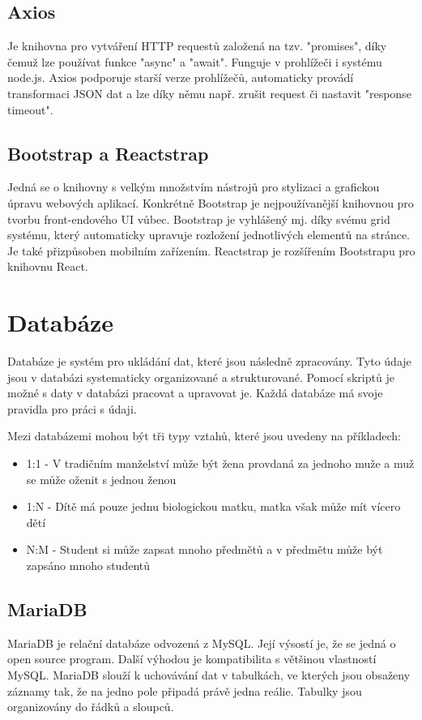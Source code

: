 \subsection{Axios}
Je knihovna pro vytváření HTTP requestů založená na tzv. "promises", díky čemuž lze používat funkce "async" a "await". Funguje v prohlížeči i systému node.js. Axios podporuje starší verze prohlížečů, automaticky provádí transformaci JSON dat a lze díky němu např. zrušit request či nastavit "response timeout". \cite{Axios}

\subsection{Bootstrap a Reactstrap}
Jedná se o knihovny s velkým množstvím nástrojů pro stylizaci a grafickou úpravu webových aplikací. Konkrétně Bootstrap je nejpoužívanější knihovnou pro tvorbu front-endového UI vůbec. Bootstrap je vyhlášený mj. díky svému grid systému, který automaticky upravuje rozložení jednotlivých elementů na stránce. Je také přizpůsoben mobilním zařízením. Reactstrap je rozšířením Bootstrapu pro knihovnu React. \cite{boot}

\section{Databáze}
Databáze je systém pro ukládání dat, které jsou následně zpracovány. Tyto údaje jsou v databázi systematicky organizované a strukturované. Pomocí skriptů je možné s daty v databázi pracovat a upravovat je. Každá databáze má svoje pravidla pro práci s údaji.

Mezi databázemi mohou být tři typy vztahů, které jsou uvedeny na příkladech:
\begin{itemize}
\item 1:1 - V tradičním manželství může být žena provdaná za jednoho muže a muž se může oženit s jednou ženou 
\item 1:N - Dítě má pouze jednu biologickou matku, matka však může mít vícero dětí
\item N:M - Student si může zapsat mnoho předmětů a v předmětu může být zapsáno mnoho studentů\cite{mnoo}
\end{itemize}

\subsection{MariaDB}
MariaDB je relační databáze odvozená z MySQL. Její výsostí je, že se jedná o open source program. Další výhodou je kompatibilita s většinou vlastností MySQL. MariaDB slouží k uchovávání dat v tabulkách, ve kterých jsou obsaženy záznamy tak, že na jedno pole připadá právě jedna reálie. Tabulky jsou organizovány do řádků a sloupců.\cite{MariaDBC}

